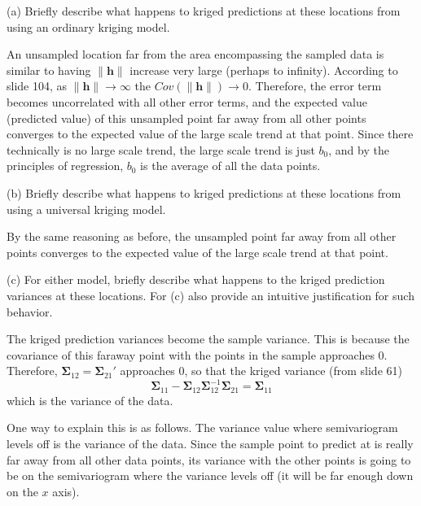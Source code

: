 \documentclass[letterpaper, 12pt]{article}
\begin{document}
(a) Briefly describe what happens to kriged predictions at these locations from using an ordinary kriging model. 

{\sf
An unsampled location far from the area encompassing the sampled data is similar to having $\|\mathbf{h} \|$ increase very large (perhaps to infinity).
According to slide 104,
as $\| \mathbf{h} \| \to \infty$ the $Cov(\| \mathbf{h} \|) \to 0$.
Therefore, the error term becomes uncorrelated with all other error terms, and the expected value (predicted value) of this unsampled point far away from all other points converges to the expected value of the large scale trend at that point. Since there technically is no large scale trend, the large scale trend is just $b_0$, and by the principles of regression, $b_0$ is the average of all the data points. 
}

(b) Briefly describe what happens to kriged predictions at these locations from using a universal kriging model. 

{\sf
By the same reasoning as before, the unsampled point far away from all other points converges to the expected value of the large scale trend at that point.
}

(c) For either model, briefly describe what happens to the kriged prediction variances at these locations. For (c) also provide an intuitive justification for such behavior.

{\sf
The kriged prediction variances become the sample variance. This is because the covariance of this faraway point with the points in the sample approaches 0. Therefore, $\boldsymbol{\Sigma}_{12} = \boldsymbol{\Sigma}_{21}'$ approaches 0, so that the kriged variance (from slide 61)
\[
\boldsymbol{\Sigma}_{11} - \boldsymbol{\Sigma}_{12} \boldsymbol{\Sigma}_{12}^{-1} \boldsymbol{\Sigma}_{21} = \boldsymbol{\Sigma}_{11}
\]
which is the variance of the data.

One way to explain this is as follows. The variance value where semivariogram levels off is the variance of the data. Since the sample point to predict at is really far away from all other data points, its variance with the other points is going to be on the semivariogram where the variance levels off (it will be far enough down on the $x$ axis).
}
\end{document}
